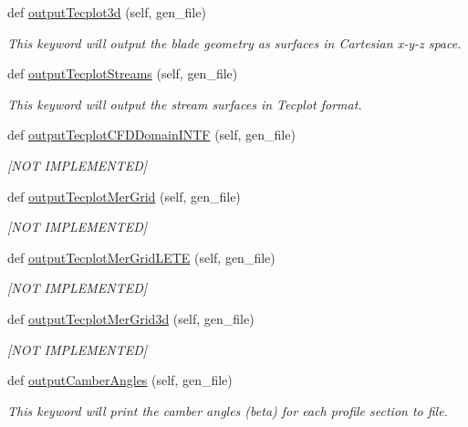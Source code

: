 \begin{DoxyCompactItemize}
def \hyperlink{a00071_a33919a9fe9364387c8f96fa21c35d2e8}{output\+Tecplot3d} (self, gen\+\_\+file)
\begin{DoxyCompactList}\small\item\em This keyword will output the blade geometry as surfaces in Cartesian x-\/y-\/z space. \end{DoxyCompactList}\item 
def \hyperlink{a00071_adb8d68c4190d41bd93a2988562f6495b}{output\+Tecplot\+Streams} (self, gen\+\_\+file)
\begin{DoxyCompactList}\small\item\em This keyword will output the stream surfaces in Tecplot format. \end{DoxyCompactList}\item 
def \hyperlink{a00071_ab3fe3d49e2e140068cb5b3b25964919f}{output\+Tecplot\+C\+F\+D\+Domain\+I\+N\+TF} (self, gen\+\_\+file)
\begin{DoxyCompactList}\small\item\em \mbox{[}N\+OT I\+M\+P\+L\+E\+M\+E\+N\+T\+ED\mbox{]} \end{DoxyCompactList}\item 
def \hyperlink{a00071_a735d8bff1d58f17130859af0f97dfbd7}{output\+Tecplot\+Mer\+Grid} (self, gen\+\_\+file)
\begin{DoxyCompactList}\small\item\em \mbox{[}N\+OT I\+M\+P\+L\+E\+M\+E\+N\+T\+ED\mbox{]} \end{DoxyCompactList}\item 
def \hyperlink{a00071_a504ccb848106dd7a0a4148941e2ec6d9}{output\+Tecplot\+Mer\+Grid\+L\+E\+TE} (self, gen\+\_\+file)
\begin{DoxyCompactList}\small\item\em \mbox{[}N\+OT I\+M\+P\+L\+E\+M\+E\+N\+T\+ED\mbox{]} \end{DoxyCompactList}\item 
def \hyperlink{a00071_a4ea4c17b862c49ad9c51398fa9d60dbc}{output\+Tecplot\+Mer\+Grid3d} (self, gen\+\_\+file)
\begin{DoxyCompactList}\small\item\em \mbox{[}N\+OT I\+M\+P\+L\+E\+M\+E\+N\+T\+ED\mbox{]} \end{DoxyCompactList}\item 
def \hyperlink{a00071_ab5d0d97e4bf1dd0ddf28f4f537fea598}{output\+Camber\+Angles} (self, gen\+\_\+file)
\begin{DoxyCompactList}\small\item\em This keyword will print the camber angles (beta) for each profile section to file. \end{DoxyCompactList}\item 

\end{DoxyCompactItemize}
